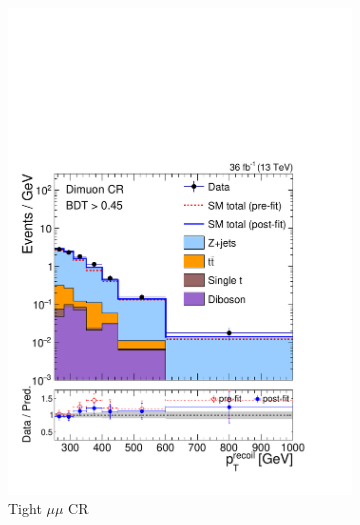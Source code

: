 \begin{figure}[]
\begin{center}
\begin{subfigure}[t]{0.24\textwidth}
            \includegraphics[width=\textwidth]{figures/monotop/postfit/stackedPostfit_dimuon_monotop.pdf}
            \caption{Tight $\mu\mu$ CR}
        \end{subfigure}
        \begin{subfigure}[t]{0.24\textwidth}

\end{subfigure}
\end{center}
\end{figure}
